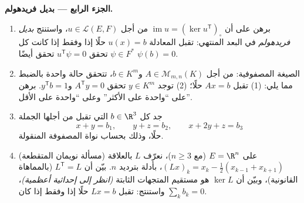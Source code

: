 \begin{problem}
\medskip
\noindent\textbf{الجزء الرابع --- بديل فريدهولم.}
\begin{enumerate}[resume]
  \item برهن على أن $\operatorname{im} u = (\ker u^{\mathsf
        T})_\circ$ من أجل $u \in \mathcal{L}(E, F)$، واستنتج
        \emph{بديل فريدهولم} في البعد المنتهي: تقبل
        المعادلة $u(x) = b$ حلًا إذا وفقط إذا كانت كل
        $\psi \in F^*$ تحقق $u^{\mathsf T}\psi = 0$ تحقق أيضًا
        $\psi(b) = 0$.
  \item الصيغة المصفوفية: من أجل $A \in \mathcal{M}_{m,n}(K)$ و$b \in
        K^m$، تتحقق حالة واحدة بالضبط مما يلي: (1) تقبل $Ax = b$
        حلًا؛ (2) توجد $y \in K^m$ تحقق
        $A^{\mathsf T}y = 0$ و$y^{\mathsf T}b = 1$. برهن على
        ``واحدة على الأكثر'' وعلى ``واحدة على الأقل''.
  \item جد كل $b \in \R^3$ التي تقبل من أجلها الجملة
        \[
        x + y = b_1, \qquad y + z = b_2, \qquad x + 2y + z = b_3
        \]
        حلًا، وذلك بحساب نواة المصفوفة المنقولة.
  \item (مسألة نويمان المتقطعة) على $E = \R^n$ (مع $n \geq 3$)،
        نعرّف $L$ بالعلاقة $(Lx)_k = x_k - \frac12(x_{k-1} +
        x_{k+1})$، بأدلة بترديد $n$. بيّن أن $L^{\mathsf T} = L$
        (بالمماهاة القانونية)، وبيّن أن $\ker L$ هو مستقيم
        المتجهات الثابتة \emph{(انظر إلى إحداثية أعظمية)}،
        واستنتج: تقبل $Lx = b$ حلًا إذا وفقط إذا كان $\sum_k b_k = 0$.
\end{enumerate}


\end{problem}
